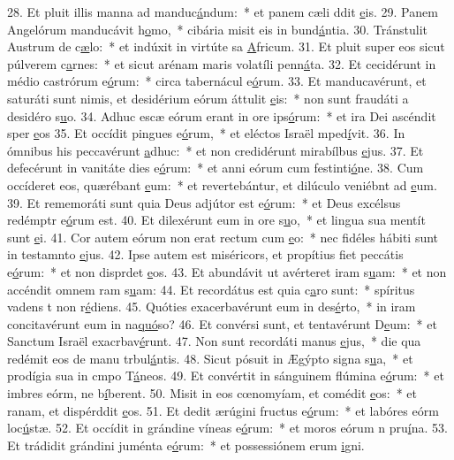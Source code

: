 28. Et pluit illis manna ad manduc\uline{á}ndum:~* et panem cæli ddit \uline{e}is.
29. Panem Angelórum manducávit h\uline{o}mo,~* cibária misit eis in bund\uline{á}ntia.
30. Tránstulit Austrum de c\uline{æ}lo:~* et indúxit in virtúte sa \uline{A}fricum.
31. Et pluit super eos sicut púlverem c\uline{a}rnes:~* et sicut arénam maris volatíli penn\uline{á}ta.
32. Et cecidérunt in médio castrórum e\uline{ó}rum:~* circa tabernácul e\uline{ó}rum.
33. Et manducavérunt, et saturáti sunt nimis, et desidérium eórum áttulit \uline{e}is:~* non sunt fraudáti a desidéro s\uline{u}o.
34. Adhuc escæ eórum erant in ore ips\uline{ó}rum:~* et ira Dei ascéndit sper \uline{e}os
35. Et occídit pingues e\uline{ó}rum,~* et eléctos Israël mped\uline{í}vit.
36. In ómnibus his peccavérunt \uline{a}dhuc:~* et non credidérunt mirabílbus \uline{e}jus.
37. Et defecérunt in vanitáte dies e\uline{ó}rum:~* et anni eórum cum festinti\uline{ó}ne.
38. Cum occíderet eos, quærébant \uline{e}um:~* et revertebántur, et dilúculo veniébnt ad \uline{e}um.
39. Et rememoráti sunt quia Deus adjútor est e\uline{ó}rum:~* et Deus excélsus redémptr e\uline{ó}rum est.
40. Et dilexérunt eum in ore s\uline{u}o,~* et lingua sua mentít sunt \uline{e}i.
41. Cor autem eórum non erat rectum cum \uline{e}o:~* nec fidéles hábiti sunt in testamnto \uline{e}jus.
42. Ipse autem est miséricors, et propítius fiet peccátis e\uline{ó}rum:~* et non disprdet \uline{e}os.
43. Et abundávit ut avérteret iram s\uline{u}am:~* et non accéndit omnem ram s\uline{u}am:
44. Et recordátus est quia c\uline{a}ro sunt:~* spíritus vadens t non r\uline{é}diens.
45. Quóties exacerbavérunt eum in des\uline{é}rto,~* in iram concitavérunt eum in na\uline{quó}so?
46. Et convérsi sunt, et tentavérunt D\uline{e}um:~* et Sanctum Israël exacrbav\uline{é}runt.
47. Non sunt recordáti manus \uline{e}jus,~* die qua redémit eos de manu trbul\uline{á}ntis.
48. Sicut pósuit in Ægýpto signa s\uline{u}a,~* et prodígia sua in cmpo T\uline{á}neos.
49. Et convértit in sánguinem flúmina e\uline{ó}rum:~* et imbres eórm, ne b\uline{í}berent.
50. Misit in eos cœnomyíam, et comédit \uline{e}os:~* et ranam, et dispérddit \uline{e}os.
51. Et dedit ærúgini fructus e\uline{ó}rum:~* et labóres eórm loc\uline{ú}stæ.
52. Et occídit in grándine víneas e\uline{ó}rum:~* et moros eórum n pru\uline{í}na.
53. Et trádidit grándini juménta e\uline{ó}rum:~* et possessiónem erum \uline{i}gni.
